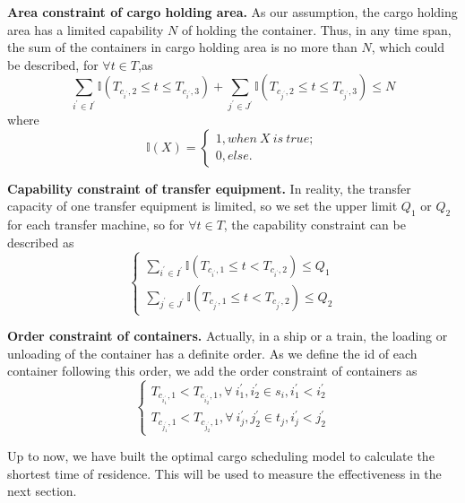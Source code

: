 \documentclass{mcmthesis}
\begin{document}
\textbf{Area constraint of cargo holding area.} As our assumption, the cargo holding area has a limited capability $N$ of holding the container. Thus, in any time span, the sum of the containers in cargo holding area is no more than $N$, which could be described, for $\forall t \in T$,as 
\begin{equation}
    \sum_{i^{\prime} \in I^{\prime}} \mathbb{I}(T_{c_{i^{\prime}},2} \leq t \leq T_{c_{i^{\prime}},3}) + \sum_{j^{\prime} \in J^{\prime}} \mathbb{I}(T_{c_{j^{\prime}},2} \leq t \leq T_{c_{j^{\prime}},3}) \leq N
\end{equation}
where
\begin{equation}
    \mathbb{I}(X) = \begin{cases}
        1, when \ X \ is \ true;\\
        0, else.
    \end{cases}
\end{equation}

\textbf{Capability constraint of transfer equipment.} In reality, the transfer capacity of one transfer equipment is limited, so we set the upper limit $Q_1$ or $Q_2$ for each transfer machine, so for $\forall t \in T$, the capability constraint can be described as
\begin{equation}
    \begin{cases}
    \sum_{i^{\prime} \in I^{\prime}} \mathbb{I}(T_{c_{i^{\prime}},1} \leq t < T_{c_{i^{\prime}},2}) \leq Q_1 \\
    \sum_{j^{\prime} \in J^{\prime}} \mathbb{I}(T_{c_{j^{\prime}},1} \leq t < T_{c_{j^{\prime}},2}) \leq Q_2
    \end{cases}
\end{equation}

\textbf{Order constraint of containers.} Actually, in a ship or a train, the loading or unloading  of the container has a definite order. As we define the id of each container following this order,  we add the order constraint of containers as 
\begin{equation}
    \begin{cases}
    T_{c_{i_1^{\prime}},1} < T_{c_{i_2^{\prime}},1}, \forall \  i_1^{\prime},i_2^{\prime} \in s_i, i_1^{\prime}<i_2^{\prime} \\
    T_{c_{j_1^{\prime}},1} < T_{c_{j_2^{\prime}},1}, \forall \  i_j^{\prime},j_2^{\prime} \in t_j, i_j^{\prime}<j_2^{\prime}
    \end{cases}
\end{equation}

Up to now, we have built the optimal cargo scheduling model to calculate the shortest time of residence. This will be used to measure the effectiveness in the next section.
\end{document}
